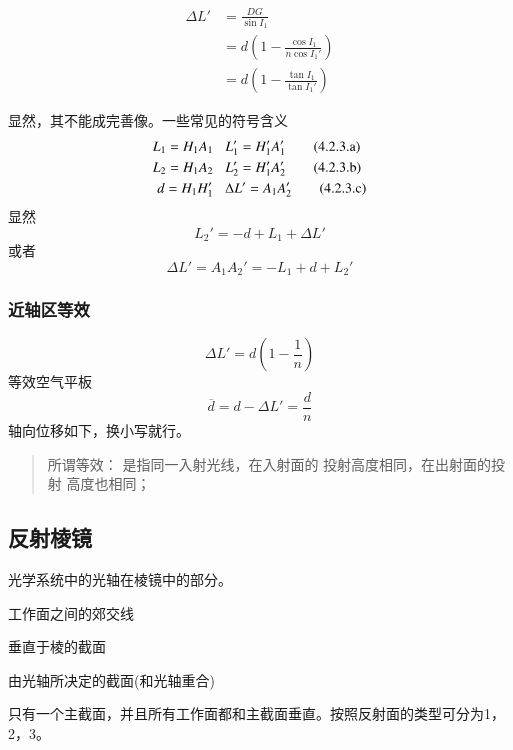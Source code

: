 \begin{align}
\Delta L'&=\frac{DG}{\sin I_1} \tag{4.2.2.a}\\
&=d(1-\frac{\cos I_1}{n \cos I_1'})\tag{4.2.2.b}\\
&=d(1-\frac{\tan I_1}{\tan I_1'}) \tag{4.2.2.c}
\end{align}

显然，其不能成完善像。一些常见的符号含义
\begin{align}
    L_1=H_1A_1 &\hspace{0.3cm}   L_1'=H_1'A_1'\tag{4.2.3.a}\\
    L_2=H_1A_2 &\hspace{0.3cm}   L_2'=H_1'A_2'\tag{4.2.3.b}\\
   d=H_1H_1'& \hspace{0.3cm} \Delta L'=A_1 A_2' \tag{4.2.3.c}
\end{align}
显然
\begin{equation}
L_2'=-d+L_1+\Delta L'\tag{4.2.4}
\end{equation}
或者
\begin{equation}
\Delta L'=A_1A_2'=-L_1+d+L_2'\tag{4.2.5}
    \end{equation}

    \subsubsection{近轴区等效}
    \begin{equation}
    \Delta L'=d(1-\frac{1}{n}) \tag{4.2.6}
    \end{equation}
    等效空气平板
    \begin{equation}
    \overline{d}=d-\Delta L'=\frac{d}{n}\tag{4.2.7}
    \end{equation}
    轴向位移如下，换小写就行。
    \begin{quote}
    {\qquad{}\ccwd\kaishu{}
    所谓等效：
是指同一入射光线，在入射面的
投射高度相同，在出射面的投射
高度也相同；
    }
    \end{quote}
\subsection{反射棱镜}
\begin{description}[leftmargin=1.7cm,style=nextline,nosep]%
    \item[光轴] 光学系统中的光轴在棱镜中的部分。
    \item[入射面和出射面] 
    \item[棱线] 工作面之间的郊交线  
    \item[主截面] 垂直于棱的截面  
    \item[光轴截面] 由光轴所决定的截面(和光轴重合)
    \item[简单棱镜] 只有一个主截面，并且所有工作面都和主截面垂直。按照反射面的类型可分为1，2，3。  
\end{description} 
